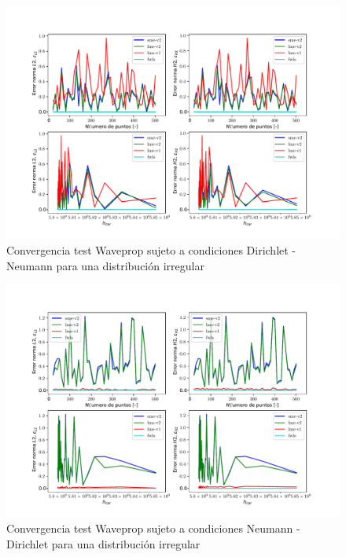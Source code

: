 \begin{figure}
    \centering
    \includegraphics[width=1\textwidth]{./Imagenes/06/comparacion_shp_irreg/Waveprop_irreg_type-2_caso-2_direct_dgesv-lapack-blas_sme-v2_lme-v2_lme-v1_fwls.pdf}
    \caption{Convergencia test Waveprop sujeto a condiciones Dirichlet - Neumann para una distribución irregular} \label{fig:Waveprop_caso-2_conv_irreg}
\end{figure}
\begin{figure}
    \centering
    \includegraphics[width=1\textwidth]{./Imagenes/06/comparacion_shp_irreg/Waveprop_irreg_type-2_caso-3_direct_dgesv-lapack-blas_sme-v2_lme-v2_lme-v1_fwls.pdf}
    \caption{Convergencia test Waveprop sujeto a condiciones Neumann - Dirichlet para una distribución irregular} \label{fig:Waveprop_caso-3_conv_irreg}
\end{figure}


